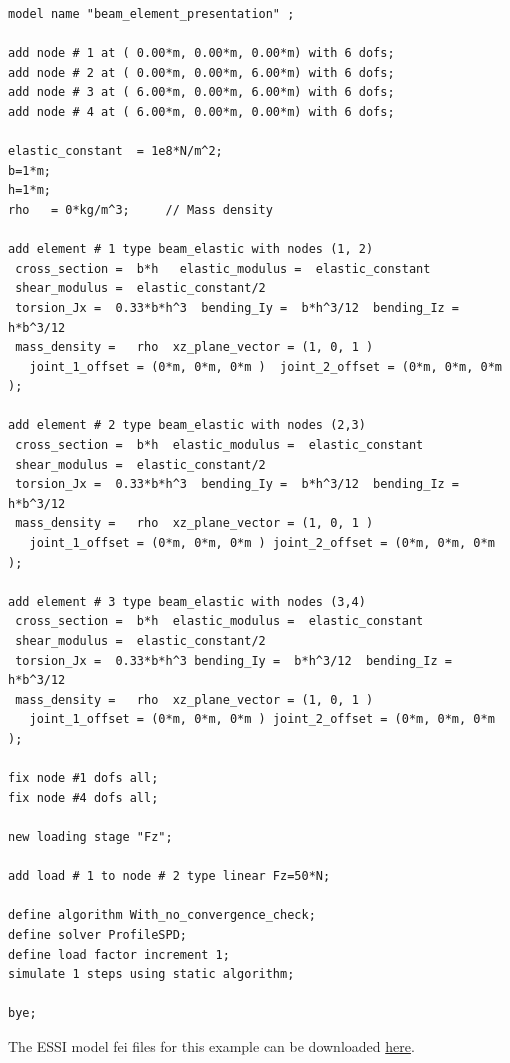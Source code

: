%
\begin{lstlisting}
model name "beam_element_presentation" ;

add node # 1 at ( 0.00*m, 0.00*m, 0.00*m) with 6 dofs;
add node # 2 at ( 0.00*m, 0.00*m, 6.00*m) with 6 dofs;
add node # 3 at ( 6.00*m, 0.00*m, 6.00*m) with 6 dofs;
add node # 4 at ( 6.00*m, 0.00*m, 0.00*m) with 6 dofs;

elastic_constant  = 1e8*N/m^2; 
b=1*m;
h=1*m;
rho   = 0*kg/m^3;     // Mass density

add element # 1 type beam_elastic with nodes (1, 2) 
 cross_section =  b*h   elastic_modulus =  elastic_constant
 shear_modulus =  elastic_constant/2
 torsion_Jx =  0.33*b*h^3  bending_Iy =  b*h^3/12  bending_Iz =  h*b^3/12
 mass_density =   rho  xz_plane_vector = (1, 0, 1 ) 
   joint_1_offset = (0*m, 0*m, 0*m )  joint_2_offset = (0*m, 0*m, 0*m );

add element # 2 type beam_elastic with nodes (2,3) 
 cross_section =  b*h  elastic_modulus =  elastic_constant
 shear_modulus =  elastic_constant/2
 torsion_Jx =  0.33*b*h^3  bending_Iy =  b*h^3/12  bending_Iz =  h*b^3/12
 mass_density =   rho  xz_plane_vector = (1, 0, 1 ) 
   joint_1_offset = (0*m, 0*m, 0*m ) joint_2_offset = (0*m, 0*m, 0*m );

add element # 3 type beam_elastic with nodes (3,4) 
 cross_section =  b*h  elastic_modulus =  elastic_constant
 shear_modulus =  elastic_constant/2
 torsion_Jx =  0.33*b*h^3 bending_Iy =  b*h^3/12  bending_Iz =  h*b^3/12
 mass_density =   rho  xz_plane_vector = (1, 0, 1 ) 
   joint_1_offset = (0*m, 0*m, 0*m ) joint_2_offset = (0*m, 0*m, 0*m );

fix node #1 dofs all;
fix node #4 dofs all;

new loading stage "Fz";

add load # 1 to node # 2 type linear Fz=50*N;

define algorithm With_no_convergence_check;
define solver ProfileSPD;
define load factor increment 1;
simulate 1 steps using static algorithm;

bye;
\end{lstlisting}

The    ESSI   model   fei   files   for   this   example   can   be   downloaded
\href{https://github.com/BorisJeremic/Real-ESSI-Examples/blob/master/model_fei_file/beam_elastic_presentation_example/beam_elastic_presentation_example.tgz?raw=true}{here}.











